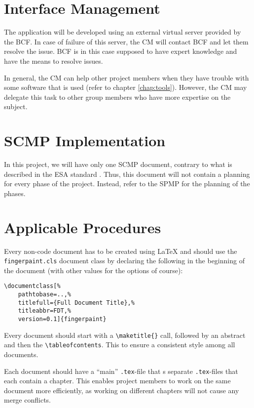 \section{Interface Management}
\label{sec:interfacemanagement}
The \projectname{} application will be developed using an external virtual server provided by the BCF. In case of failure of this server, the CM will contact BCF and let them resolve the issue. BCF is in this case supposed to have expert knowledge and have the means to resolve issues.

In general, the CM can help other project members when they have trouble with some software that is used (refer to chapter \ref{chap:tools}). However, the CM may delegate this task to other group members who have more expertise on the subject.

\section{SCMP Implementation}
In this project, we will have only one SCMP document, contrary to what is described in the ESA standard \cite{esa}. Thus, this document will not contain a planning for every phase of the project. Instead, refer to the SPMP for the planning of the phases.

\section{Applicable Procedures}
Every non-code document has to be created using \LaTeX{} and should use the \texttt{fingerpaint.cls} document class by declaring the following in the beginning of the document (with other values for the options of course):
\begin{center}\begin{minipage}{0.5\textwidth}\begin{verbatim}
\documentclass[%
    pathtobase=..,%
    titlefull={Full Document Title},%
    titleabbr=FDT,%
    version=0.1]{fingerpaint}
\end{verbatim}\end{minipage}\end{center}
Every document should start with a \verb|\maketitle{}| call, followed by an abstract and then the \verb|\tableofcontents|. This to ensure a consistent style among all documents.

Each document should have a ``main'' \texttt{.tex}-file that \verb||s separate \texttt{.tex}-files that each contain a chapter. This enables project members to work on the same document more efficiently, as working on different chapters will not cause any merge conflicts.

